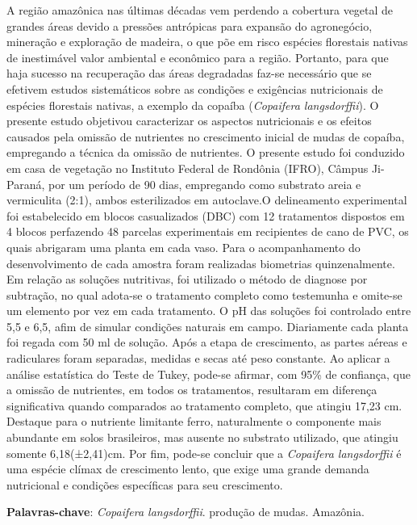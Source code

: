 \documentclass[article,12pt,onesidea,4paper,english,brazil]{abntex2}
\begin{document}
	\noindent A região amazônica nas últimas décadas vem perdendo a cobertura vegetal de
	grandes áreas devido a pressões antrópicas para expansão do agronegócio,
	mineração e exploração de madeira, o que põe em risco espécies florestais nativas
	de inestimável valor ambiental e econômico para a região. Portanto, para que haja
	sucesso na recuperação das áreas degradadas faz-se necessário que se efetivem
	estudos sistemáticos sobre as condições e exigências nutricionais de espécies
	florestais nativas, a exemplo da copaíba (\textit{Copaifera langsdorffii}). O presente estudo
	objetivou caracterizar os aspectos nutricionais e os efeitos causados pela omissão
	de nutrientes no crescimento inicial de mudas de copaíba, empregando a técnica da
	omissão de nutrientes. O presente estudo foi conduzido em casa de vegetação no
	Instituto Federal de Rondônia (IFRO), Câmpus Ji-Paraná, por um período de 90
	dias, empregando como substrato areia e vermiculita (2:1), ambos esterilizados em
	autoclave.O delineamento experimental foi estabelecido em blocos casualizados
	(DBC) com 12 tratamentos dispostos em 4 blocos perfazendo 48 parcelas
	experimentais em recipientes de cano de PVC, os quais abrigaram uma planta em
	cada vaso. Para o acompanhamento do desenvolvimento de cada amostra foram
	realizadas biometrias quinzenalmente. Em relação as soluções nutritivas, foi
	utilizado o método de diagnose por subtração, no qual adota-se o tratamento
	completo como testemunha e omite-se um elemento por vez em cada tratamento. O
	pH das soluções foi controlado entre 5,5 e 6,5, afim de simular condições naturais
	em campo. Diariamente cada planta foi regada com 50 ml de solução. Após a etapa
	de crescimento, as partes aéreas e radiculares foram separadas, medidas e secas
	até peso constante. Ao aplicar a análise estatística do Teste de Tukey, pode-se
	afirmar, com 95\% de confiança, que a omissão de nutrientes, em todos os
	tratamentos, resultaram em diferença significativa quando comparados ao
	tratamento completo, que atingiu 17,23 cm. Destaque para o nutriente limitante ferro,
	naturalmente o componente mais abundante em solos brasileiros, mas ausente no
	substrato utilizado, que atingiu somente 6,18(±2,41)cm. Por fim, pode-se concluir
	que a \textit{Copaifera langsdorffii} é uma espécie clímax de crescimento lento, que exige
	uma grande demanda nutricional e condições específicas para seu crescimento.
	
	\vspace{\onelineskip}
	
	\noindent
	\textbf{Palavras-chave}: \textit{Copaifera langsdorffii}. produção de mudas. Amazônia.
	
\end{document}
